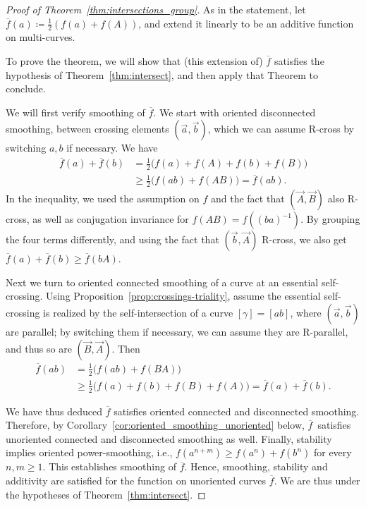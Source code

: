 \documentclass[11pt]{amsart}
\newcommand{\ora}[1]{\overrightarrow{#1}}
\numberwithin{equation}{section}
\numberwithin{figure}{section}
\theoremstyle{definition}
\theoremstyle{plain}
\begin{document}
\begin{proof}[Proof of Theorem~\ref{thm:intersections_group}]
As in the statement, let $\overline{f}(a) \coloneqq
\frac{1}{2}\left(f(a) + f(A) \right)$, and extend it linearly to be an
additive
function on multi-curves.

To prove the theorem, we will show that (this extension of) $\overline{f}$ satisfies the hypothesis of Theorem~\ref{thm:intersect}, and then apply that Theorem to conclude.


We will first verify smoothing of $\overline{f}$.
We start
with oriented disconnected smoothing, between crossing elements
$(\ora{a},\ora{b})$, which we can assume R-cross by switching $a,b$ if
necessary. We have
\begin{align*}
  \overline{f}(a) + \overline{f}(b)
    &= \frac{1}{2}\bigl(f(a) + f(A) + f(b) + f(B)\bigr)\\[2pt]
    &\ge \frac{1}{2}\bigl(f(ab) + f(AB)\bigr) = \overline{f}(ab).
\end{align*}
In the inequality, we used the assumption on $f$ and the fact that
$(\ora{A},\ora{B})$ also
R-cross, as well as conjugation invariance for $f(AB) = f((ba)^{-1})$.
By grouping the four terms differently, and using the fact that
$(\ora{b},\ora{A})$ R-cross, we also get $\overline{f}(a) +
\overline{f}(b) \ge \overline{f}(bA)$.

Next we turn to oriented connected smoothing of a curve at an
essential self-crossing.
Using Proposition~\ref{prop:crossings-triality}, assume the essential
self-crossing is realized by the self-intersection of a curve
$[\gamma]=[ab]$, where $(\ora{a},\ora{b})$ are parallel; by switching
them if necessary, we can assume they are R-parallel, and thus so are
$(\ora{B},\ora{A})$. Then
\begin{align*}
  \overline{f}(ab)
    &= \frac{1}{2}\bigl(f(ab) + f(BA)\bigr) \\[2pt]
    &\ge \frac12\bigl(f(a) + f(b) + f(B) + f(A)\bigr)
     = \overline{f}(a) + \overline{f}(b).
\end{align*}

We have thus deduced $\overline{f}$ satisfies oriented connected and disconnected smoothing. Therefore, by Corollary~\ref{cor:oriented_smoothing_unoriented} below,
$\overline{f}$~satisfies unoriented connected and disconnected smoothing as well. 
Finally, stability implies oriented power-smoothing, i.e., $f(a^{n+m}) \geq f(a^n) + f(b^n)$ for every $n, m \geq 1$. This establishes smoothing of $\overline{f}$. Hence, smoothing, stability and additivity are satisfied for the function on unoriented curves $\overline{f}$.
We are thus under the
hypotheses of Theorem~\ref{thm:intersect}.
\end{proof}
\end{document}
